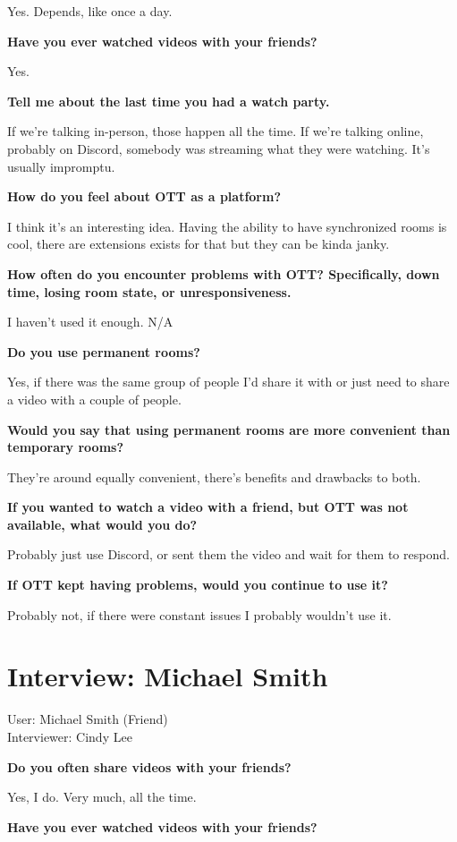 Yes. Depends, like once a day.

\textbf{Have you ever watched videos with your friends?}

Yes.

\textbf{Tell me about the last time you had a watch party.}

If we're talking in-person, those happen all the time. If we're talking online, probably on Discord, somebody was streaming what they were watching. It's usually impromptu.

\textbf{How do you feel about OTT as a platform?}

I think it's an interesting idea. Having the ability to have synchronized rooms is cool, there are extensions exists for that but they can be kinda janky.

\textbf{How often do you encounter problems with OTT? Specifically, down time, losing room state, or unresponsiveness.}

I haven't used it enough. N/A

\textbf{Do you use permanent rooms?}

Yes, if there was the same group of people I'd share it with or just need to share a video with a couple of people.

\textbf{Would you say that using permanent rooms are more convenient than temporary rooms?}

They're around equally convenient, there's benefits and drawbacks to both.

\textbf{If you wanted to watch a video with a friend, but OTT was not available, what would you do?}

Probably just use Discord, or sent them the video and wait for them to respond.

\textbf{If OTT kept having problems, would you continue to use it?}

Probably not, if there were constant issues I probably wouldn't use it.

\section{Interview: Michael Smith}

User: Michael Smith (Friend)\\
Interviewer: Cindy Lee

\textbf{Do you often share videos with your friends?}

Yes, I do. Very much, all the time.

\textbf{Have you ever watched videos with your friends?}

